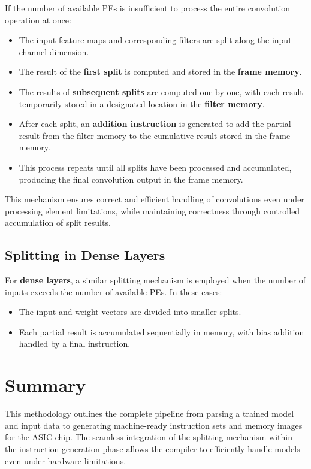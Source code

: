 \documentclass[12pt]{report}
\begin{document}
If the number of available PEs is insufficient to process the entire convolution operation at once:
\begin{itemize}
    \item The input feature maps and corresponding filters are split along the input channel dimension.
    \item The result of the \textbf{first split} is computed and stored in the \textbf{frame memory}.
    \item The results of \textbf{subsequent splits} are computed one by one, with each result temporarily stored in a designated location in the \textbf{filter memory}.
    \item After each split, an \textbf{addition instruction} is generated to add the partial result from the filter memory to the cumulative result stored in the frame memory.
    \item This process repeats until all splits have been processed and accumulated, producing the final convolution output in the frame memory.
\end{itemize}

This mechanism ensures correct and efficient handling of convolutions even under processing element limitations, while maintaining correctness through controlled accumulation of split results.

\subsection*{Splitting in Dense Layers}

For \textbf{dense layers}, a similar splitting mechanism is employed when the number of inputs exceeds the number of available PEs. In these cases:
\begin{itemize}
    \item The input and weight vectors are divided into smaller splits.
    \item Each partial result is accumulated sequentially in memory, with bias addition handled by a final instruction.
\end{itemize}

\section{Summary}

This methodology outlines the complete pipeline from parsing a trained model and input data to generating machine-ready instruction sets and memory images for the ASIC chip. The seamless integration of the splitting mechanism within the instruction generation phase allows the compiler to efficiently handle models even under hardware limitations. 
\end{document}
